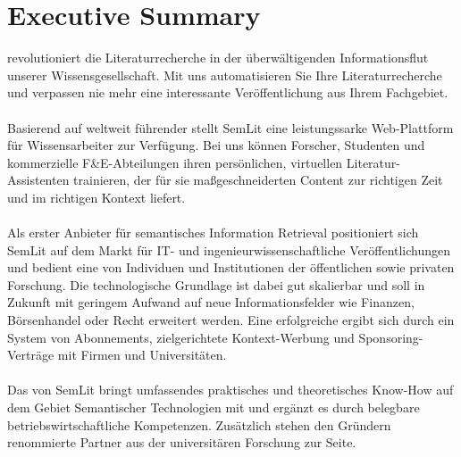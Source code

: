\section{Executive Summary}

\textsc{\color{orange}{SemLit}} revolutioniert die Literaturrecherche in der überwältigenden Informationsflut unserer Wissensgesellschaft. Mit uns automatisieren Sie Ihre Literaturrecherche und verpassen nie mehr eine interessante Veröffentlichung aus Ihrem Fachgebiet. 
\\
\\
Basierend auf weltweit führender {\color{orange}{Semantischer Technologie}} stellt SemLit eine leistungssarke Web-Plattform für Wissensarbeiter zur Verfügung. Bei uns können Forscher, Studenten und kommerzielle F\&E-Abteilungen ihren persönlichen, virtuellen Literatur-Assistenten trainieren, der für sie maßgeschneiderten Content zur richtigen Zeit und im richtigen Kontext liefert. 
\\
\\
Als erster Anbieter für semantisches Information Retrieval positioniert sich SemLit auf dem Markt für IT- und ingenieurwissenschaftliche Veröffentlichungen und bedient eine {\color{orange}{stark wachsende Zielgruppe}} von Individuen und Institutionen der öffentlichen sowie privaten Forschung. Die technologische Grundlage ist dabei gut skalierbar und soll in Zukunft mit geringem Aufwand auf neue Informationsfelder wie Finanzen, Börsenhandel oder Recht erweitert werden. Eine erfolgreiche {\color{orange}{Monetarisierung}} ergibt sich durch ein System von Abonnements, zielgerichtete Kontext-Werbung und Sponsoring-Verträge mit Firmen und Universitäten. 
\\
\\
Das {\color{orange}{Gründerteam}} von SemLit bringt umfassendes praktisches und theoretisches Know-How auf dem Gebiet Semantischer Technologien mit und ergänzt es durch belegbare  betriebswirtschaftliche Kompetenzen. Zusätzlich stehen den Gründern renommierte Partner aus der universitären Forschung zur Seite.




